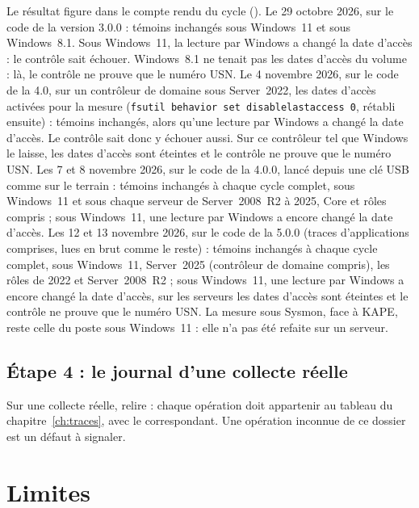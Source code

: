 \documentclass[11pt,a4paper,oneside]{report}
\begin{document}
Le résultat figure dans le compte rendu du cycle ().
Le 29 octobre 2026, sur le code de la version 3.0.0 : témoins inchangés sous
Windows~11 et sous Windows~8.1. Sous Windows~11, la lecture par Windows a
changé la date d'accès : le contrôle sait échouer. Windows~8.1 ne tenait pas
les dates d'accès du volume : là, le contrôle ne prouve que le numéro USN.
Le 4 novembre 2026, sur le code de la 4.0, sur un contrôleur de domaine sous
Server~2022, les dates d'accès activées pour la mesure
(\texttt{fsutil behavior set disablelastaccess 0}, rétabli ensuite) : témoins
inchangés, alors qu'une lecture par Windows a changé la date d'accès. Le
contrôle sait donc y échouer aussi. Sur ce contrôleur tel que Windows le laisse,
les dates d'accès sont éteintes et le contrôle ne prouve que le numéro USN.
Les 7 et 8 novembre 2026, sur le code de la 4.0.0, \wac{} lancé depuis une clé
USB comme sur le terrain : témoins inchangés à chaque cycle complet, sous
Windows~11 et sous chaque serveur de Server~2008~R2 à 2025, Core et rôles
compris ; sous Windows~11, une lecture par Windows a encore changé la date
d'accès.
Les 12 et 13 novembre 2026, sur le code de la 5.0.0 (traces d'applications
comprises, lues en brut comme le reste) : témoins inchangés à chaque cycle
complet, sous Windows~11, Server~2025 (contrôleur de domaine compris), les
rôles de 2022 et Server~2008~R2 ; sous Windows~11, une lecture par Windows a
encore changé la date d'accès, sur les serveurs les dates d'accès sont
éteintes et le contrôle ne prouve que le numéro USN.
La mesure sous Sysmon, face à KAPE, reste celle du poste sous Windows~11 : elle
n'a pas été refaite sur un serveur.

\section{Étape 4 : le journal d'une collecte réelle}

Sur une collecte réelle, relire  : chaque
opération doit appartenir au tableau du chapitre~\ref{ch:traces}, avec le
 correspondant. Une opération inconnue de ce dossier est un
défaut à signaler.

\chapter{Limites}
\end{document}
